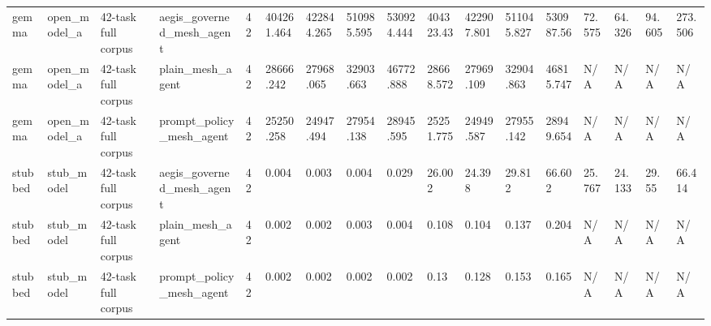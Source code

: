 \begin{tabular}{lllllllllllllllll}
gemma & open\_model\_a & 42-task full corpus & aegis\_governed\_mesh\_agent & 42 & 404261.464 & 422844.265 & 510985.595 & 530924.444 & 404323.43 & 422907.801 & 511045.827 & 530987.56 & 72.575 & 64.326 & 94.605 & 273.506 \\
gemma & open\_model\_a & 42-task full corpus & plain\_mesh\_agent & 42 & 28666.242 & 27968.065 & 32903.663 & 46772.888 & 28668.572 & 27969.109 & 32904.863 & 46815.747 & N/A & N/A & N/A & N/A \\
gemma & open\_model\_a & 42-task full corpus & prompt\_policy\_mesh\_agent & 42 & 25250.258 & 24947.494 & 27954.138 & 28945.595 & 25251.775 & 24949.587 & 27955.142 & 28949.654 & N/A & N/A & N/A & N/A \\
stubbed & stub\_model & 42-task full corpus & aegis\_governed\_mesh\_agent & 42 & 0.004 & 0.003 & 0.004 & 0.029 & 26.002 & 24.398 & 29.812 & 66.602 & 25.767 & 24.133 & 29.55 & 66.414 \\
stubbed & stub\_model & 42-task full corpus & plain\_mesh\_agent & 42 & 0.002 & 0.002 & 0.003 & 0.004 & 0.108 & 0.104 & 0.137 & 0.204 & N/A & N/A & N/A & N/A \\
stubbed & stub\_model & 42-task full corpus & prompt\_policy\_mesh\_agent & 42 & 0.002 & 0.002 & 0.002 & 0.002 & 0.13 & 0.128 & 0.153 & 0.165 & N/A & N/A & N/A & N/A \\
 \hline
\end{tabular}
